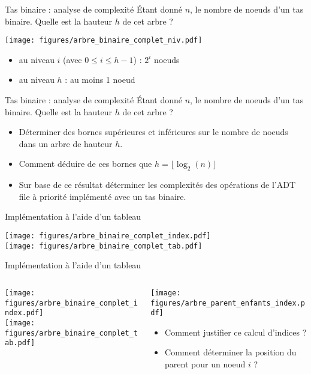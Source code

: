 \documentclass[handout]{beamer}
\begin{document}
\begin{frame}[fragile]{Tas binaire : analyse de complexité}
	Étant donné $n$, le nombre de noeuds d'un tas binaire. Quelle est la hauteur $h$ de cet arbre ?
	\begin{center}
		\texttt{[image: figures/arbre\_binaire\_complet\_niv.pdf]}
	\end{center}
	\begin{itemize}
		\item au niveau $i$ (avec $0 \leqslant i \leqslant h-1$) : $2^i$ noeuds
		\item au niveau $h$ : au moins 1 noeud
	\end{itemize}
\end{frame}

\begin{frame}[fragile]{Tas binaire : analyse de complexité}
	Étant donné $n$, le nombre de noeuds d'un tas binaire. Quelle est la hauteur $h$ de cet arbre ?
	\begin{itemize}
		\item Déterminer des bornes supérieures et inférieures sur le nombre de noeuds dans un arbre de hauteur $h$.
		\item Comment déduire de ces bornes que $h = \lfloor \log_2(n) \rfloor$
		\item Sur base de ce résultat déterminer les complexités des opérations de l'ADT file à priorité implémenté avec un tas binaire.
	\end{itemize}
\end{frame}

\begin{frame}[fragile]{Implémentation à l'aide d'un tableau}
	\begin{center}
		\texttt{[image: figures/arbre\_binaire\_complet\_index.pdf]}\\
		\texttt{[image: figures/arbre\_binaire\_complet\_tab.pdf]}
	\end{center}
\end{frame}

\begin{frame}[fragile]{Implémentation à l'aide d'un tableau}
	\begin{columns}
		\begin{column}{0.45\textwidth}
			\centering
			\texttt{[image: figures/arbre\_binaire\_complet\_index.pdf]}\\
			\texttt{[image: figures/arbre\_binaire\_complet\_tab.pdf]}
		\end{column}
		\begin{column}{0.45\textwidth}
			\centering
			\texttt{[image: figures/arbre\_parent\_enfants\_index.pdf]}
			\begin{itemize}
				\item Comment justifier ce calcul d'indices ?
				\item Comment déterminer la position du parent pour un noeud $i$ ?
			\end{itemize}
		\end{column}
	\end{columns}
\end{frame}
\end{document}
